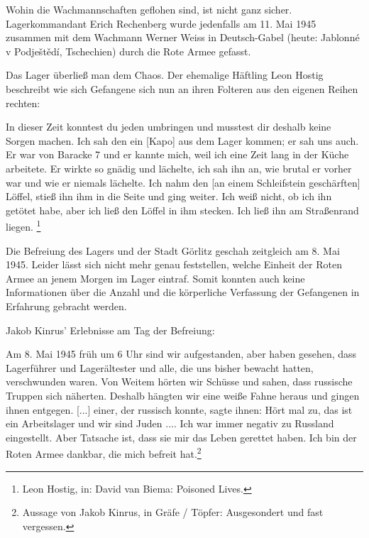 \newpage
Wohin die Wachmannschaften geflohen sind, ist nicht ganz sicher. Lagerkommandant Erich Rechenberg wurde jedenfalls am 11. Mai 1945 zusammen mit dem Wachmann Werner Weiss in Deutsch-Gabel (heute: Jablonné v Podještědí, Tschechien) durch die Rote Armee gefasst.\newline

Das Lager überließ man dem Chaos. Der ehemalige Häftling Leon Hostig beschreibt wie sich Gefangene sich nun an ihren Folteren aus den eigenen Reihen rechten:
\begin{leftbar} 
In dieser Zeit konntest du jeden umbringen und musstest dir deshalb keine Sorgen machen. Ich sah den ein [Kapo] aus dem Lager kommen; er sah uns auch. Er war von Baracke 7 und er kannte mich, weil ich eine Zeit lang in der Küche arbeitete. Er wirkte so gnädig und lächelte, ich sah ihn an, wie brutal er vorher war und wie er niemals lächelte. Ich nahm den [an einem Schleifstein geschärften] Löffel, stieß ihn ihm in die Seite und ging weiter. Ich weiß nicht, ob ich ihn getötet habe, aber ich ließ den Löffel in ihm stecken. Ich ließ ihn am Straßenrand liegen. 
\footnote{Leon Hostig, in: David van Biema: Poisoned Lives.}
\end{leftbar} 

Die Befreiung des Lagers und der Stadt Görlitz geschah zeitgleich am 8. Mai 1945. Leider lässt sich nicht mehr genau feststellen, welche Einheit der Roten Armee an jenem Morgen im Lager eintraf. Somit konnten auch keine Informationen über die Anzahl und die körperliche Verfassung der Gefangenen in Erfahrung gebracht werden.\newline

Jakob Kinrus' Erlebnisse am Tag der Befreiung:
\begin{leftbar} 
Am 8. Mai 1945 früh um 6 Uhr sind wir aufgestanden, aber haben gesehen, dass Lagerführer und Lagerältester und alle, die uns bisher bewacht hatten, verschwunden waren. Von Weitem hörten wir Schüsse und sahen, dass russische Truppen sich näherten. Deshalb hängten wir eine weiße Fahne heraus und gingen ihnen entgegen. [...] einer, der russisch konnte, sagte ihnen: \glqq Hört mal zu, das ist ein Arbeitslager und wir sind Juden ...\grqq. Ich war immer negativ zu Russland eingestellt. Aber Tatsache ist, dass sie mir das Leben gerettet haben. Ich bin der Roten Armee dankbar, die mich befreit hat.\footnote{Aussage von Jakob Kinrus, in Gräfe / Töpfer: Ausgesondert und fast vergessen.}
\end{leftbar}


